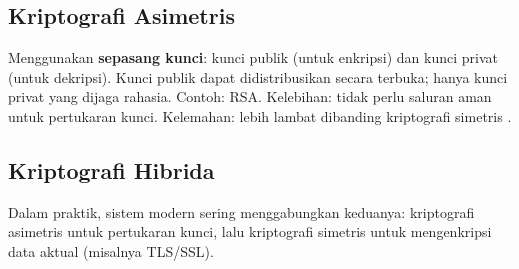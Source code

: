 \subsection{Kriptografi Asimetris}
Menggunakan \textbf{sepasang kunci}: kunci publik (untuk enkripsi) dan kunci privat (untuk dekripsi). Kunci publik dapat didistribusikan secara terbuka; hanya kunci privat yang dijaga rahasia. Contoh: RSA. Kelebihan: tidak perlu saluran aman untuk pertukaran kunci. Kelemahan: lebih lambat dibanding kriptografi simetris \cite{schneier1996}.

\subsection{Kriptografi Hibrida}
Dalam praktik, sistem modern sering menggabungkan keduanya: kriptografi asimetris untuk pertukaran kunci, lalu kriptografi simetris untuk mengenkripsi data aktual (misalnya TLS/SSL).
